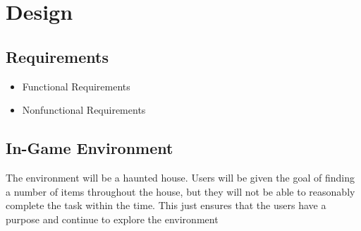 \documentclass[12pt,a4paper]{article}
\begin{document}
\section{Design}







\subsection{Requirements}

	\begin{itemize}
		\item Functional Requirements
		\item Nonfunctional Requirements
	\end{itemize}

\subsection{In-Game Environment}
The environment will be a haunted house. Users will be given the goal of finding a number of items throughout the house, but they will not be able to reasonably complete the task within the time. This just ensures that the users have a purpose and continue to explore the environment
\end{document}
